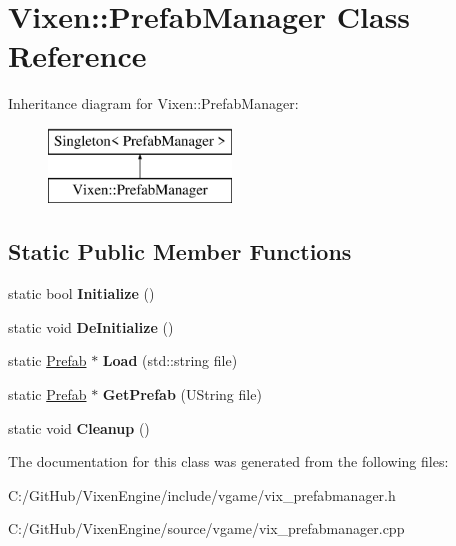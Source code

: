 \hypertarget{class_vixen_1_1_prefab_manager}{}\section{Vixen\+:\+:Prefab\+Manager Class Reference}
\label{class_vixen_1_1_prefab_manager}
Inheritance diagram for Vixen\+:\+:Prefab\+Manager\+:\begin{figure}[H]
\begin{center}
\leavevmode
\includegraphics[height=2.000000cm]{class_vixen_1_1_prefab_manager}
\end{center}
\end{figure}
\subsection*{Static Public Member Functions}
\begin{DoxyCompactItemize}
\item 
\hypertarget{class_vixen_1_1_prefab_manager_a5b510bf9c0f9319d7c6d7ad4f239d564}{}static bool {\bfseries Initialize} ()\label{class_vixen_1_1_prefab_manager_a5b510bf9c0f9319d7c6d7ad4f239d564}

\item 
\hypertarget{class_vixen_1_1_prefab_manager_a9be08a20d02ce70f8d0a041c2724a899}{}static void {\bfseries De\+Initialize} ()\label{class_vixen_1_1_prefab_manager_a9be08a20d02ce70f8d0a041c2724a899}

\item 
\hypertarget{class_vixen_1_1_prefab_manager_a36f03542dcc6b5efccf1afb533e635f9}{}static \hyperlink{class_vixen_1_1_prefab}{Prefab} $\ast$ {\bfseries Load} (std\+::string file)\label{class_vixen_1_1_prefab_manager_a36f03542dcc6b5efccf1afb533e635f9}

\item 
\hypertarget{class_vixen_1_1_prefab_manager_aa92347c5e36e4f91df0ffc4074740769}{}static \hyperlink{class_vixen_1_1_prefab}{Prefab} $\ast$ {\bfseries Get\+Prefab} (U\+String file)\label{class_vixen_1_1_prefab_manager_aa92347c5e36e4f91df0ffc4074740769}

\item 
\hypertarget{class_vixen_1_1_prefab_manager_a1ce231f1cf4f0e74dc72873618b1945a}{}static void {\bfseries Cleanup} ()\label{class_vixen_1_1_prefab_manager_a1ce231f1cf4f0e74dc72873618b1945a}

\end{DoxyCompactItemize}


The documentation for this class was generated from the following files\+:\begin{DoxyCompactItemize}
\item 
C\+:/\+Git\+Hub/\+Vixen\+Engine/include/vgame/vix\+\_\+prefabmanager.\+h\item 
C\+:/\+Git\+Hub/\+Vixen\+Engine/source/vgame/vix\+\_\+prefabmanager.\+cpp\end{DoxyCompactItemize}

